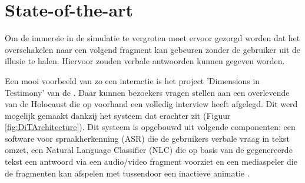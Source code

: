 %
%
%
%
%


\section{State-of-the-art}%
\label{sec:state-of-the-art}

Om de immersie in de simulatie te vergroten moet ervoor gezorgd worden dat het overschakelen naar een volgend fragment kan gebeuren zonder de gebruiker uit de illusie te halen. Hiervoor zouden verbale antwoorden kunnen gegeven worden.

Een mooi voorbeeld van zo een interactie is het project 'Dimensions in Testimony' van de \textcite{USCShoahFoundation2020}. Daar kunnen bezoekers vragen stellen aan een overlevende van de Holocaust die op voorhand een volledig interview heeft afgelegd. Dit werd mogelijk gemaakt dankzij het systeem dat erachter zit (Figuur \ref{fig:DiTArchitecture}). Dit systeem is opgebouwd uit volgende componenten: een software voor spraakherkenning (ASR) die de gebruikers verbale vraag in tekst omzet, een Natural Language Classifier (NLC) die op basis van de gegenereerde tekst een antwoord via een audio/video fragment voorziet en een mediaspeler die de fragmenten kan afspelen met tussendoor een inactieve animatie \autocite{Traum2015}.

